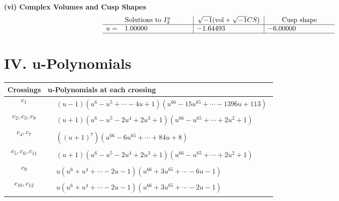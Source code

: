 \documentclass[1p]{elsarticle_modified}
\theoremstyle{definition}
\newcommand{\I}{\sqrt{-1}}
\begin{document}
\newpage\flushleft \textbf{(vi) Complex Volumes and Cusp Shapes}
$$\begin{array}{c|c|c}  
\text{Solutions to }I^u_{3}& \I (\text{vol} + \sqrt{-1}CS) & \text{Cusp shape}\\
 \hline 
\begin{aligned}
u &= \phantom{-}1.00000\phantom{ +0.000000I}\end{aligned}
 & -1.64493\phantom{ +0.000000I} & -6.00000\phantom{ +0.000000I}\\
 \hline 
 \end{array}$$\newpage
\newpage\renewcommand{\arraystretch}{1}
\centering \section*{ IV. u-Polynomials}
\begin{tabular}{m{50pt}|m{274pt}}
Crossings & \hspace{64pt}u-Polynomials at each crossing \\
\hline $$\begin{aligned}c_{1}\end{aligned}$$&$\begin{aligned}
&(u-1)(u^6- u^5+\cdots-4 u+1)(u^{66}-15 u^{65}+\cdots-1396 u+113)
\end{aligned}$\\
\hline $$\begin{aligned}c_{2},c_{3},c_{8}\end{aligned}$$&$\begin{aligned}
&(u+1)(u^6- u^5-2 u^4+2 u^3+1)(u^{66}- u^{65}+\cdots+2 u^2+1)
\end{aligned}$\\
\hline $$\begin{aligned}c_{4},c_{7}\end{aligned}$$&$\begin{aligned}
&((u+1)^7)(u^{66}-6 u^{65}+\cdots+84 u+8)
\end{aligned}$\\
\hline $$\begin{aligned}c_{5},c_{6},c_{11}\end{aligned}$$&$\begin{aligned}
&(u+1)(u^6- u^5-2 u^4+2 u^3+1)(u^{66}- u^{65}+\cdots+2 u^2+1)
\end{aligned}$\\
\hline $$\begin{aligned}c_{9}\end{aligned}$$&$\begin{aligned}
&u(u^6+u^4+\cdots-2 u-1)(u^{66}+3 u^{65}+\cdots-6 u-1)
\end{aligned}$\\
\hline $$\begin{aligned}c_{10},c_{12}\end{aligned}$$&$\begin{aligned}
&u(u^6+u^4+\cdots-2 u-1)(u^{66}+3 u^{65}+\cdots-2 u-1)
\end{aligned}$\\
\hline
\end{tabular}\newpage\renewcommand{\arraystretch}{1}
\end{document}
